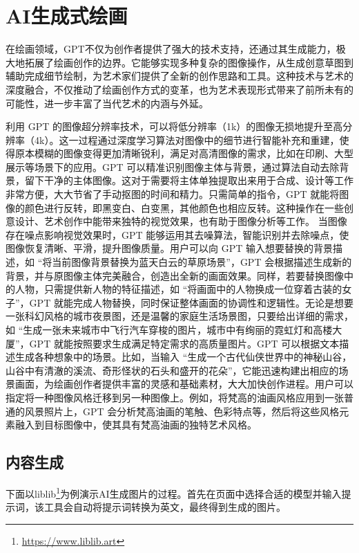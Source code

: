 \section{AI生成式绘画}\label{sec:painting}
在绘画领域，GPT不仅为创作者提供了强大的技术支持，还通过其生成能力，极大地拓展了绘画创作的边界。它能够实现多种复杂的图像操作，从生成创意草图到辅助完成细节绘制，为艺术家们提供了全新的创作思路和工具。这种技术与艺术的深度融合，不仅推动了绘画创作方式的变革，也为艺术表现形式带来了前所未有的可能性，进一步丰富了当代艺术的内涵与外延。

利用 GPT 的图像超分辨率技术，可以将低分辨率（1k）的图像无损地提升至高分辨率（4k）。这一过程通过深度学习算法对图像中的细节进行智能补充和重建，使得原本模糊的图像变得更加清晰锐利，满足对高清图像的需求，比如在印刷、大型展示等场景下的应用。GPT 可以精准识别图像主体与背景，通过算法自动去除背景，留下干净的主体图像。这对于需要将主体单独提取出来用于合成、设计等工作非常方便，大大节省了手动抠图的时间和精力。只需简单的指令，GPT 就能将图像的颜色进行反转，即黑变白、白变黑，其他颜色也相应反转。这种操作在一些创意设计、艺术创作中能带来独特的视觉效果，也有助于图像分析等工作。
当图像存在噪点影响视觉效果时，GPT 能够运用其去噪算法，智能识别并去除噪点，使图像恢复清晰、平滑，提升图像质量。用户可以向 GPT 输入想要替换的背景描述，如 “将当前图像背景替换为蓝天白云的草原场景”，GPT 会根据描述生成新的背景，并与原图像主体完美融合，创造出全新的画面效果。同样，若要替换图像中的人物，只需提供新人物的特征描述，如 “将画面中的人物换成一位穿着古装的女子”，GPT 就能完成人物替换，同时保证整体画面的协调性和逻辑性。无论是想要一张科幻风格的城市夜景图，还是温馨的家庭生活场景图，只要给出详细的需求，如 “生成一张未来城市中飞行汽车穿梭的图片，城市中有绚丽的霓虹灯和高楼大厦”，GPT 就能按照要求生成满足特定需求的高质量图片。GPT 可以根据文本描述生成各种想象中的场景。比如，当输入 “生成一个古代仙侠世界中的神秘山谷，山谷中有清澈的溪流、奇形怪状的石头和盛开的花朵”，它能迅速构建出相应的场景画面，为绘画创作者提供丰富的灵感和基础素材，大大加快创作进程。用户可以指定将一种图像风格迁移到另一种图像上。例如，将梵高的油画风格应用到一张普通的风景照片上，GPT 会分析梵高油画的笔触、色彩特点等，然后将这些风格元素融入到目标图像中，使其具有梵高油画的独特艺术风格。

\subsection{内容生成}

下面以liblib\footnote{\url{https://www.liblib.art}}为例演示AI生成图片的过程。首先在页面中选择合适的模型并输入提示词，该工具会自动将提示词转换为英文，最终得到生成的图片。

